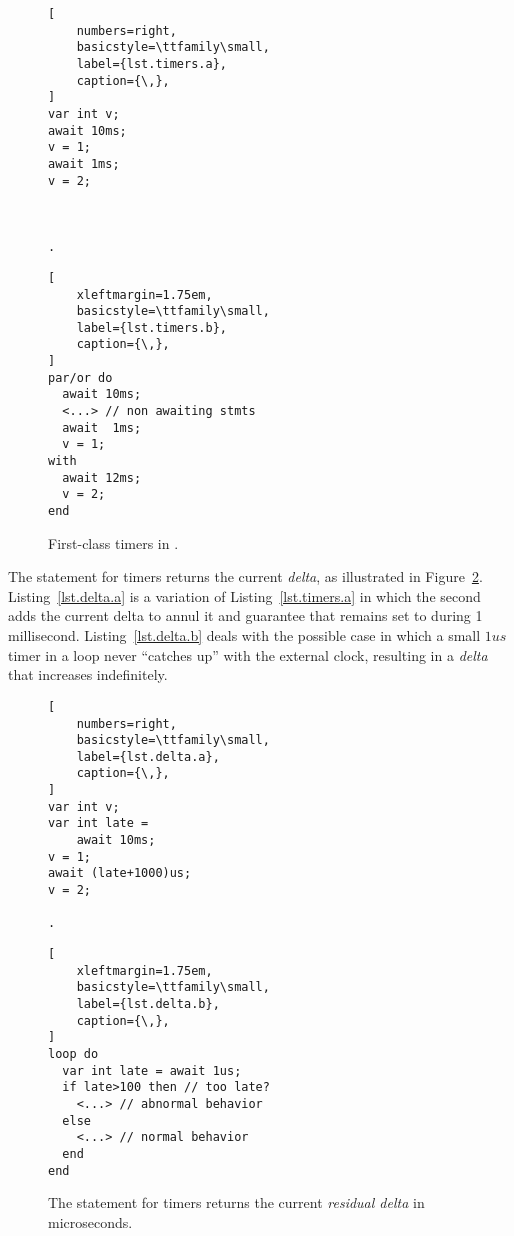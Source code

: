 \begin{figure}
\begin{minipage}[t]{0.37\linewidth}
\begin{lstlisting}[
    numbers=right,
    basicstyle=\ttfamily\small,
    label={lst.timers.a},
    caption={\,},
]
var int v;
await 10ms;
v = 1;
await 1ms;
v = 2;



.
\end{lstlisting}
\end{minipage}
%
\begin{minipage}[t]{0.60\linewidth}
\begin{lstlisting}[
    xleftmargin=1.75em,
    basicstyle=\ttfamily\small,
    label={lst.timers.b},
    caption={\,},
]
par/or do
  await 10ms;
  <...> // non awaiting stmts
  await  1ms;
  v = 1;
with
  await 12ms;
  v = 2;
end
\end{lstlisting}
\end{minipage}
\caption{ First-class timers in \CEU.
\label{lst.timers}
}
\end{figure}

The  statement for timers returns the current \emph{delta}, as
illustrated in Figure~\ref{lst.delta}.
Listing~\ref{lst.delta.a} is a variation of Listing~\ref{lst.timers.a} in which
the second  adds the current delta to annul it and guarantee that
 remains set to  during 1 millisecond.
Listing~\ref{lst.delta.b} deals with the possible case in which a small $1us$
timer in a loop never ``catches up'' with the external clock, resulting in a
\emph{delta} that increases indefinitely.

\begin{figure}
\begin{minipage}[t]{0.37\linewidth}
\begin{lstlisting}[
    numbers=right,
    basicstyle=\ttfamily\small,
    label={lst.delta.a},
    caption={\,},
]
var int v;
var int late =
    await 10ms;
v = 1;
await (late+1000)us;
v = 2;

.
\end{lstlisting}
\end{minipage}
%
\begin{minipage}[t]{0.60\linewidth}
\begin{lstlisting}[
    xleftmargin=1.75em,
    basicstyle=\ttfamily\small,
    label={lst.delta.b},
    caption={\,},
]
loop do
  var int late = await 1us;
  if late>100 then // too late?
    <...> // abnormal behavior
  else
    <...> // normal behavior
  end
end
\end{lstlisting}
\end{minipage}
\caption{ The  statement for timers returns the current
\emph{residual delta} in microseconds.
\label{lst.delta}
}
\end{figure}

